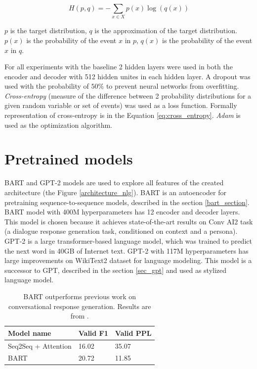 \begin{eqfloat}
\begin{equation} \label{eq:cross_entropy}
H(p,q) = -\sum_{x \in X} p(x)\log(q(x))
\end{equation}
\caption{$p$ is the target distribution, $q$ is the approximation of the target distribution. $p(x)$ is the probability of the event $x$ in $p$, $q(x)$ is the probability of the event $x$ in $q$.}
\end{eqfloat}

For all experiments with the baseline 2 hidden layers were used in both the encoder and decoder with 512 hidden unites in each hidden layer. A dropout \cite{srivastava2014dropout} was used with the probability of $50\%$ to prevent neural networks from overfitting. \textit{Cross-entropy} (measure of the difference between 2 probability distributions for a given random variable or set of events) was used as a loss function. Formally representation of cross-entropy is in the Equation \ref{eq:cross_entropy}. \textit{Adam} \cite{kingma2014adam} is used as the optimization algorithm.

\section{Pretrained models}
BART and GPT-2 models are used to explore all features of the created architecture (the Figure \ref{architecture_nlg}). BART is an autoencoder for pretraining sequence-to-sequence models, described in the section \ref{bart_section}. BART model with 400M hyperparameters has 12 encoder and decoder layers. This model is chosen because it achieves state-of-the-art results on Conv AI2 task (a dialogue response generation task, conditioned on context and a persona). GPT-2 is a large transformer-based language model, which was trained to predict the next word in 40GB of Internet text. GPT-2 with 117M hyperparameters has large improvements on WikiText2 dataset for language modeling. This model is a successor to GPT, described in the section \ref{sec_gpt} and used as stylized language model. 

\begin{table}[ht]
\centering
 \begin{tabular}{|p{5cm}|p{3cm}|p{3cm}|} 
 \hline\hline
 \textbf{Model name} & \textbf{Valid F1} & \textbf{Valid PPL} \\
 \hline\hline
 Seq2Seq + Attention & 16.02 & 35.07 \\
 \hline
 BART & 20.72 & 11.85 \\
 \hline\hline
 \end{tabular}
 \caption{BART outperforms previous work on conversational response generation. Results are from \cite{lewis2019bart}.}
\label{tab:bart_statistic}
\end{table}


